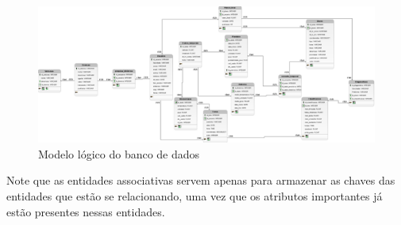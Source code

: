 \documentclass[
  a4paper,%
  12pt,%
  english,%
  brazilian,%
]{article}
\begin{document}
            \begin{figure}[h]
\centering
\caption{Modelo lógico do banco de dados}%
\label{fig:diagrama-objetos}
 \includegraphics[width=1.0\textwidth]{Logos/logico.png}
\end{figure}

    Note que as entidades associativas servem apenas para armazenar as chaves das entidades que estão se relacionando, uma vez que os atributos importantes já estão presentes nessas entidades.
\end{document}
